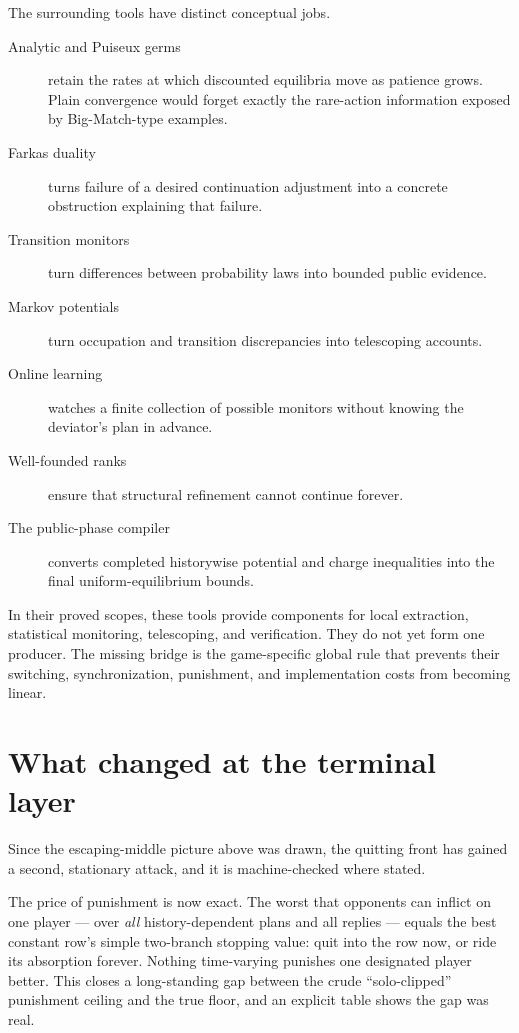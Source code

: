 \documentclass[11pt]{article}
\begin{document}
The surrounding tools have distinct conceptual jobs.
\begin{description}
  \item[Analytic and Puiseux germs]
    retain the rates at which discounted equilibria move as patience grows.
    Plain convergence would forget exactly the rare-action information
    exposed by Big-Match-type examples.

  \item[Farkas duality]
    turns failure of a desired continuation adjustment into a concrete
    obstruction explaining that failure.

  \item[Transition monitors]
    turn differences between probability laws into bounded public evidence.

  \item[Markov potentials]
    turn occupation and transition discrepancies into telescoping accounts.

  \item[Online learning]
    watches a finite collection of possible monitors without knowing the
    deviator's plan in advance.

  \item[Well-founded ranks]
    ensure that structural refinement cannot continue forever.

  \item[The public-phase compiler]
    converts completed historywise potential and charge inequalities into
    the final uniform-equilibrium bounds.
\end{description}

In their proved scopes, these tools provide components for local extraction,
statistical monitoring, telescoping, and verification.  They do not yet form
one producer.  The missing bridge is the game-specific global rule that
prevents their switching, synchronization, punishment, and implementation
costs from becoming linear.

\section{What changed at the terminal layer}

Since the escaping-middle picture above was drawn, the quitting front has
gained a second, stationary attack, and it is machine-checked where stated.

The price of punishment is now exact.  The worst that opponents can inflict
on one player --- over \emph{all} history-dependent plans and all replies ---
equals the best constant row's simple two-branch stopping value: quit into
the row now, or ride its absorption forever.  Nothing time-varying punishes
one designated player better.  This closes a long-standing gap between the
crude ``solo-clipped'' punishment ceiling and the true floor, and an
explicit table shows the gap was real.
\end{document}

